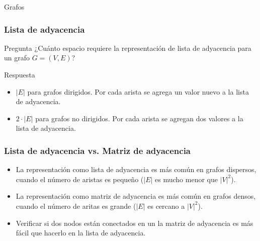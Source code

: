 \documentclass{beamer}
\begin{document}
\begin{section}{Grafos}
	\begin{frame}
		\frametitle{Lista de adyacencia}
		\begin{alertblock}{Pregunta}
			¿Cuánto espacio requiere la representación de lista de adyacencia para un grafo $G = (V, E)$?
		\end{alertblock}\pause
		\begin{exampleblock}{Respuesta}
			\begin{itemize}
				\item{$|E|$ para grafos dirigidos. Por cada arista se agrega un valor nuevo a la lista de adyacencia.}
				\item{$2 \cdot |E|$ para grafos no dirigidos. Por cada arista se agregan dos valores a la lista de adyacencia.}
			\end{itemize}
		\end{exampleblock}
	\end{frame}
	
	\begin{frame}
		\frametitle{Lista de adyacencia vs. Matriz de adyacencia}
		\begin{itemize}
			\item{La representación como lista de adyacencia es más común en grafos dispersos, cuando el número de aristas es pequeño ($|E|$ es mucho menor que $|V|^2$).}
			\item{La representación como matriz de adyacencia es más común en grafos densos, cuando el número de aritas es grande ($|E|$ es cercano a $|V|^2$).}
			\item{Verificar si dos nodos están conectados en un la matriz de adyacencia es más fácil que hacerlo en la lista de adyacencia.} %
		\end{itemize}
	\end{frame}
	

\end{section}
\end{document}
